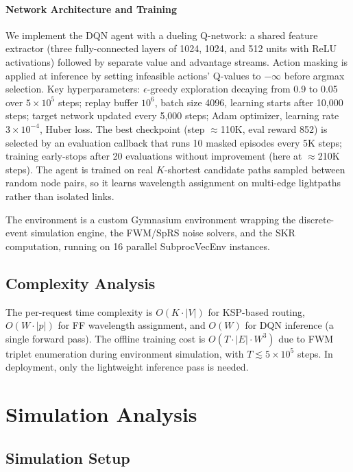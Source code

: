 \documentclass[conference]{IEEEtran}
\begin{document}
\paragraph{Network Architecture and Training}

We implement the DQN agent \cite{b11} with a dueling Q-network: a shared feature extractor (three fully-connected layers of 1024, 1024, and 512 units with ReLU activations) followed by separate value and advantage streams. Action masking is applied at inference by setting infeasible actions' Q-values to $-\infty$ before argmax selection. Key hyperparameters: $\epsilon$-greedy exploration decaying from 0.9 to 0.05 over $5\times10^5$ steps; replay buffer $10^6$, batch size 4096, learning starts after 10,000 steps; target network updated every 5,000 steps; Adam optimizer, learning rate $3\times10^{-4}$, Huber loss. The best checkpoint (step $\approx$110K, eval reward 852) is selected by an evaluation callback that runs 10 masked episodes every 5K steps; training early-stops after 20 evaluations without improvement (here at $\approx$210K steps). The agent is trained on real $K$-shortest candidate paths sampled between random node pairs, so it learns wavelength assignment on multi-edge lightpaths rather than isolated links.

The environment is a custom Gymnasium environment wrapping the discrete-event simulation engine, the FWM/SpRS noise solvers, and the SKR computation, running on 16 parallel SubprocVecEnv instances.

\subsection{Complexity Analysis}

The per-request time complexity is $O(K \cdot |V|)$ for KSP-based routing, $O(W \cdot |p|)$ for FF wavelength assignment, and $O(W)$ for DQN inference (a single forward pass). The offline training cost is $O(T \cdot |E| \cdot W^3)$ due to FWM triplet enumeration during environment simulation, with $T \lesssim 5\times10^5$ steps. In deployment, only the lightweight inference pass is needed.

\section{Simulation Analysis}

\subsection{Simulation Setup}
\end{document}
